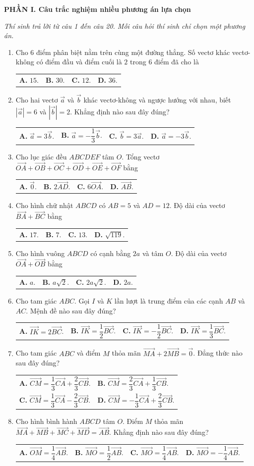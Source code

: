 \documentclass[10pt,a4paper]{article}
\makeatletter
\newcommand{\parttitle}[1]{%
  \par\vspace{4.5pt}\needspace{3\baselineskip}%
  \begin{tcolorbox}[enhanced,frame hidden,interior style={left color=brandTint,right color=white},borderline west={3pt}{0pt}{brand},sharp corners,left=6pt,right=4pt,top=3pt,bottom=3pt,boxsep=0pt,before skip=0pt,after skip=2pt]
    {\sffamily\normalsize\bfseries\color{ink}#1}
  \end{tcolorbox}\nopagebreak%
}
\newcommand{\four}[4]{\par\vspace{1.2pt}\noindent\begin{tabularx}{\linewidth}{@{}*{4}{>{\raggedright\arraybackslash}X}@{}}\textsf{\textbf{\color{ink}A.}} #1&\textsf{\textbf{\color{ink}B.}} #2&\textsf{\textbf{\color{ink}C.}} #3&\textsf{\textbf{\color{ink}D.}} #4\end{tabularx}}
\newcommand{\two}[4]{\par\vspace{1.2pt}\noindent\begin{tabularx}{\linewidth}{@{}*{2}{>{\raggedright\arraybackslash}X}@{}}\textsf{\textbf{\color{ink}A.}} #1&\textsf{\textbf{\color{ink}B.}} #2\\[3.5pt]\textsf{\textbf{\color{ink}C.}} #3&\textsf{\textbf{\color{ink}D.}} #4\end{tabularx}}
\makeatother
\begin{document}
\parttitle{PHẦN I. Câu trắc nghiệm nhiều phương án lựa chọn}
\textit{\color{mutedSlate}\small Thí sinh trả lời từ câu 1 đến câu 20. Mỗi câu hỏi thí sinh chỉ chọn một phương án.}
\begin{enumerate}
\item Cho $6$ điểm phân biệt nằm trên cùng một đường thẳng. Số vectơ khác vectơ-không có điểm đầu và điểm cuối là $2$ trong $6$ điểm đã cho là
\four{$15$.}{$30$.}{$12$.}{$36$.}

\item Cho hai vectơ $\vec{a}$ và $\vec{b}$ khác vectơ-không và ngược hướng với nhau, biết $|\vec{a}| = 6$ và $|\vec{b}| = 2$. Khẳng định nào sau đây đúng?
\four{$\vec{a} = 3\vec{b}$.}{$\vec{a} = -\dfrac{1}{3}\vec{b}$.}{$\vec{b} = 3\vec{a}$.}{$\vec{a} = -3\vec{b}$.}

\item Cho lục giác đều $ABCDEF$ tâm $O$. Tổng vectơ $\vec{OA} + \vec{OB} + \vec{OC} + \vec{OD} + \vec{OE} + \vec{OF}$ bằng
\four{$\vec{0}$.}{$2\vec{AD}$.}{$6\vec{OA}$.}{$\vec{AB}$.}

\item Cho hình chữ nhật $ABCD$ có $AB = 5$ và $AD = 12$. Độ dài của vectơ $\vec{BA} + \vec{BC}$ bằng
\four{$17$.}{$7$.}{$13$.}{$\sqrt{119}$.}

\item Cho hình vuông $ABCD$ có cạnh bằng $2a$ và tâm $O$. Độ dài của vectơ $\vec{OA} + \vec{OB}$ bằng
\four{$a$.}{$a\sqrt{2}$.}{$2a\sqrt{2}$.}{$2a$.}

\item Cho tam giác $ABC$. Gọi $I$ và $K$ lần lượt là trung điểm của các cạnh $AB$ và $AC$. Mệnh đề nào sau đây đúng?
\four{$\vec{IK} = 2\vec{BC}$.}{$\vec{IK} = \dfrac{1}{2}\vec{BC}$.}{$\vec{IK} = -\dfrac{1}{2}\vec{BC}$.}{$\vec{IK} = \dfrac{1}{3}\vec{BC}$.}

\item Cho tam giác $ABC$ và điểm $M$ thỏa mãn $\vec{MA} + 2\vec{MB} = \vec{0}$. Đẳng thức nào sau đây đúng?
\two{$\vec{CM} = \dfrac{1}{3}\vec{CA} + \dfrac{2}{3}\vec{CB}$.}{$\vec{CM} = \dfrac{2}{3}\vec{CA} + \dfrac{1}{3}\vec{CB}$.}{$\vec{CM} = \dfrac{1}{3}\vec{CA} - \dfrac{2}{3}\vec{CB}$.}{$\vec{CM} = -\dfrac{1}{3}\vec{CA} + \dfrac{2}{3}\vec{CB}$.}

\item Cho hình bình hành $ABCD$ tâm $O$. Điểm $M$ thỏa mãn $\vec{MA} + \vec{MB} + \vec{MC} + \vec{MD} = \vec{AB}$. Khẳng định nào sau đây đúng?
\four{$\vec{OM} = \dfrac{1}{4}\vec{AB}$.}{$\vec{MO} = \dfrac{1}{2}\vec{AB}$.}{$\vec{MO} = \dfrac{1}{4}\vec{AB}$.}{$\vec{MO} = -\dfrac{1}{4}\vec{AB}$.}


\end{enumerate}
\end{document}
